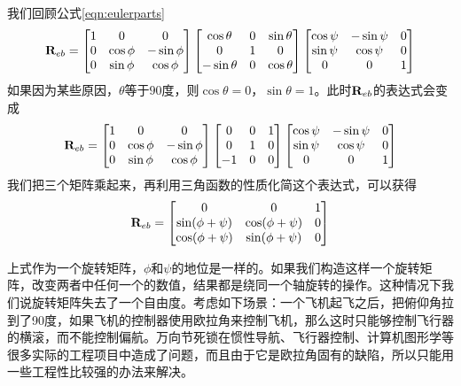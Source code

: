 \documentclass[11pt]{article}
\begin{document}
我们回顾公式\ref{eqn:eulerparts}
$$
{\bf R}_{eb} = 
\begin{bmatrix}
1 & 0 & 0 \\
0 & \cos\phi & -\sin\phi \\
0 & \sin\phi & \cos\phi 
\end{bmatrix} 
\begin{bmatrix}
\cos\theta & 0 & \sin\theta\\
0 & 1 & 0\\
-\sin\theta & 0 & \cos\theta \\
\end{bmatrix}
\begin{bmatrix}
\cos\psi & - \sin\psi & 0\\
\sin\psi & \cos\psi & 0\\
0 & 0 & 1
\end{bmatrix}
$$
如果因为某些原因，$\theta$等于$90$度，则$\cos\theta = 0$，$\sin\theta = 1$。此时${\bf R}_{eb}$的表达式会变成
$$
{\bf R}_{eb} = 
\begin{bmatrix}
1 & 0 & 0 \\
0 & \cos\phi & -\sin\phi \\
0 & \sin\phi & \cos\phi 
\end{bmatrix} 
\begin{bmatrix}
0 & 0 & 1\\
0 & 1 & 0\\
-1 & 0 & 0 \\
\end{bmatrix}
\begin{bmatrix}
\cos\psi & - \sin\psi & 0\\
\sin\psi & \cos\psi & 0\\
0 & 0 & 1
\end{bmatrix}
$$
我们把三个矩阵乘起来，再利用三角函数的性质化简这个表达式，可以获得
$$
{\bf R}_{eb} = 
\begin{bmatrix}
0 & 0 & 1 \\
\sin(\phi + \psi) & \cos(\phi + \psi) & 0 \\
\cos(\phi + \psi) & \sin(\phi + \psi) & 0 
\end{bmatrix}
$$

上式作为一个旋转矩阵，$\phi$和$\psi$的地位是一样的。如果我们构造这样一个旋转矩阵，改变两者中任何一个的数值，结果都是绕同一个轴旋转的操作。这种情况下我们说旋转矩阵失去了一个自由度。考虑如下场景：一个飞机起飞之后，把俯仰角拉到了90度，如果飞机的控制器使用欧拉角来控制飞机，那么这时只能够控制飞行器的横滚，而不能控制偏航。万向节死锁在惯性导航、飞行器控制、计算机图形学等很多实际的工程项目中造成了问题，而且由于它是欧拉角固有的缺陷，所以只能用一些工程性比较强的办法来解决。
\end{document}
